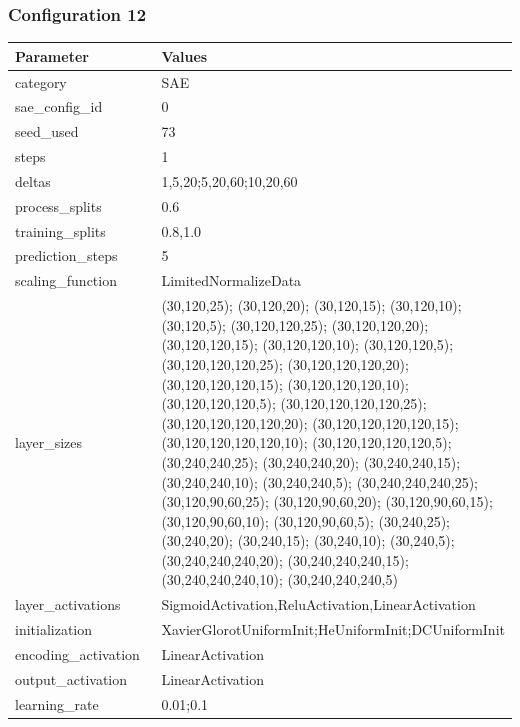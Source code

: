 \documentclass[a4paper,11pt,oneside]{article}
\theoremstyle{plain}
\theoremstyle{definition}
\begin{document}
	\newpage
	\subsubsection{Configuration 12}\label{config12}

	\begin{longtable}[H]{|p{0.3\linewidth}|p{0.7\linewidth}|} \hline			\rowcolor{beaublue}\textbf{Parameter} &\textbf{Values} \\\hline{category} & {SAE} \\\hline
		{sae\_config\_id} & {0} \\\hline
		{seed\_used} & {73} \\\hline
		{steps} & {1} \\\hline
		{deltas} & {1,5,20;5,20,60;10,20,60} \\\hline
		{process\_splits} & {0.6} \\\hline
		{training\_splits} & {0.8,1.0} \\\hline
		{prediction\_steps} & {5} \\\hline
		{scaling\_function} & {LimitedNormalizeData} \\\hline
		{layer\_sizes} & {(30,120,25); (30,120,20); (30,120,15); (30,120,10); (30,120,5); (30,120,120,25); (30,120,120,20); (30,120,120,15); (30,120,120,10); (30,120,120,5); (30,120,120,120,25); (30,120,120,120,20); (30,120,120,120,15); (30,120,120,120,10); (30,120,120,120,5); (30,120,120,120,120,25); (30,120,120,120,120,20); (30,120,120,120,120,15); (30,120,120,120,120,10); (30,120,120,120,120,5); (30,240,240,25); (30,240,240,20); (30,240,240,15); (30,240,240,10); (30,240,240,5); (30,240,240,240,25); (30,120,90,60,25); (30,120,90,60,20); (30,120,90,60,15); (30,120,90,60,10); (30,120,90,60,5); (30,240,25); (30,240,20); (30,240,15); (30,240,10); (30,240,5); (30,240,240,240,20); (30,240,240,240,15); (30,240,240,240,10); (30,240,240,240,5)} \\\hline
		{layer\_activations} & {SigmoidActivation,ReluActivation,LinearActivation} \\\hline
		{initialization} & {XavierGlorotUniformInit;HeUniformInit;DCUniformInit} \\\hline
		{encoding\_activation} & {LinearActivation} \\\hline
		{output\_activation} & {LinearActivation} \\\hline
		{learning\_rate} & {0.01;0.1} \\\hline

\end{longtable}
\end{document}
